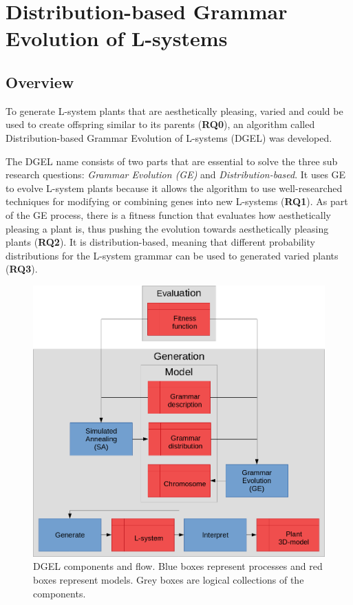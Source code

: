 \chapter{Distribution-based Grammar Evolution of L-systems}


\section{Overview}
\label{sec:overview}
To generate L-system plants that are aesthetically pleasing, varied and could be used to create offspring similar to its parents (\textbf{RQ0}), an algorithm called Distribution-based Grammar Evolution of L-systems (DGEL) was developed.

The DGEL name consists of two parts that are essential to solve the three sub research questions: \textit{Grammar Evolution (GE)} and \textit{Distribution-based}.
It uses GE to evolve L-system plants because it allows the algorithm to use well-researched techniques for modifying or combining genes into new L-systems (\textbf{RQ1}).
As part of the GE process, there is a fitness function that evaluates how aesthetically pleasing a plant is, thus pushing the evolution towards aesthetically pleasing plants (\textbf{RQ2}).
It is distribution-based, meaning that different probability distributions for the L-system grammar can be used to generated varied plants (\textbf{RQ3}).

\begin{figure}
    \centering
    \includegraphics[width=1.0\textwidth]{figures/dgel}
    \caption[DGEL components and flow]{DGEL components and flow. Blue boxes represent processes and red boxes represent models. Grey boxes are logical collections of the components.}
    \label{fig:dgel}
\end{figure}

